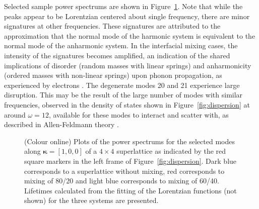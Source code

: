 \documentclass[aps,prb,preprint,preprintnumbers,amsmath,amssymb,floatfix,superscriptaddress]{revtex4}
\begin{document}
Selected sample power spectrums are shown in Figure~\ref{fig:sed}. Note that while the peaks appear to be Lorentzian centered about single frequency, there are minor signatures at other frequencies. These signatures are attributed to the approximation that the normal mode of the harmonic system is equivalent to the normal mode of the anharmonic system. In the interfacial mixing cases, the intensity of the signatures becomes amplified, an indication of the shared implications of disorder (random masses with linear springs) and anharmonicity (ordered masses with non-linear springs) \cite{RevModPhys.53.175} upon phonon propagation, as experienced by electrons \cite{mott1961theory}. The degenerate modes 20 and 21 experience large disruption. This may be the result of the large number of modes with similar frequencies, observed in the density of states shown in Figure~\ref{fig:dispersion} at around $\omega=12$, available for these modes to interact and scatter with, as described in Allen-Feldmann theory \cite{allen_thermal_1993,feldman_thermal_1993-1}.
\begin{figure}[!h]
\begin{center}
\renewcommand{\figure}{Fig.}
\caption{(Colour online) Plots of the power spectrums for the selected modes along $\pmb{\kappa}=[1,0,0]$ of a $4\times4$ superlattice as indicated by the red square markers in the left frame of Figure~\ref{fig:dispersion}. Dark blue corresponds to a superlattice without mixing, red corresponds to mixing of 80/20 and light blue corresponds to mixing of 60/40. Lifetimes calculated from the fitting of the Lorentzian functions (not shown) for the three systems are presented.}
\label{fig:sed}
\end{center}
\end{figure}
\end{document}
